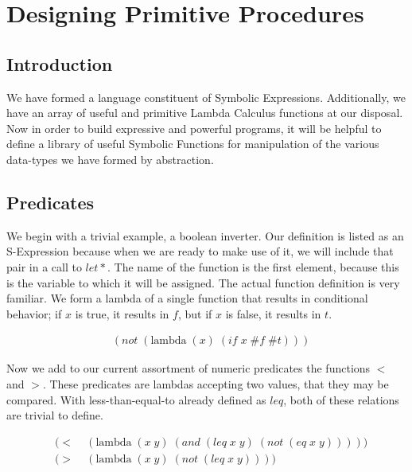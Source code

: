 
\chapter{Designing Primitive Procedures}
\section{Introduction}
We have formed a language constituent of Symbolic Expressions. Additionally, we 
have an array of useful and primitive Lambda Calculus functions at our disposal. 
Now in order to build expressive and powerful programs, it will be helpful to 
define a library of useful Symbolic Functions for manipulation of the various 
data-types we have formed by abstraction.

\section{Predicates}
We begin with a trivial example, a boolean inverter. Our definition is listed as 
an S-Expression because when we are ready to make use of it, we will include that 
pair in a call to $let*$. The name of the function is the first element, because 
this is the variable to which it will be assigned. The actual function definition 
is very familiar. We form a lambda of a single function that results in 
conditional behavior; if $x$ is true, it results in $f$, but if $x$ is false, it 
results in $t$.

\begin{figure}[ht]
\caption{}\label{scheme}
\begin{align*}
& (not \; (\text{lambda} \; (x) \; (if \; x \; \#f \; \#t)))
\end{align*}
\end{figure}

Now we add to our current assortment of numeric predicates the functions $<$ and 
$>$. These predicates are lambdas accepting two values, that they may be compared. 
With less-than-equal-to already defined as $leq$, both of these relations are 
trivial to define.

\begin{figure}[ht]
\caption{}\label{scheme}
\begin{align*}
& (< \; &(\text{lambda} \; (x \; y) \; (and \; (leq \; x \; y) \; (not \; (eq \; x \; y)))))
\\& (> \; &(\text{lambda} \; (x \; y) \; (not \; (leq \; x \; y))))
\end{align*}
\end{figure}

